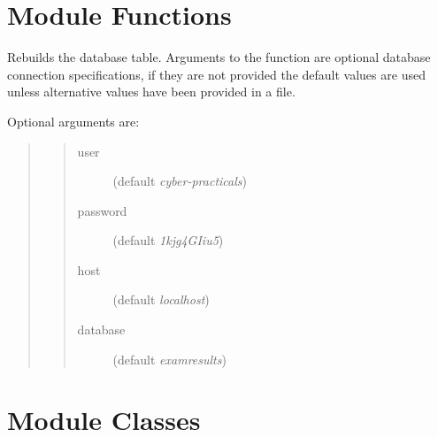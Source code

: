 \documentclass[a4paper,11pt,english]{sphinxmanual}
\begin{document}
\section{Module Functions}
\label{reference:ref-module-functions}\label{reference:module-functions}

\begin{fulllineitems}
\label{reference:dbinfer.rebuild}
Rebuilds the database table. Arguments to the function are optional database connection
specifications, if they are not provided the default values are used unless
alternative values have been provided in a  file.

Optional arguments are:
\begin{quote}
\begin{quote}\begin{description}
\item[{user}] \leavevmode
(default \emph{cyber-practicals})

\item[{password}] \leavevmode
(default \emph{1kjg4GIiu5})

\item[{host}] \leavevmode
(default \emph{localhost})

\item[{database}] \leavevmode
(default \emph{examresults})

\end{description}\end{quote}
\end{quote}

\end{fulllineitems}



\section{Module Classes}
\label{reference:module-classes}
\end{document}
